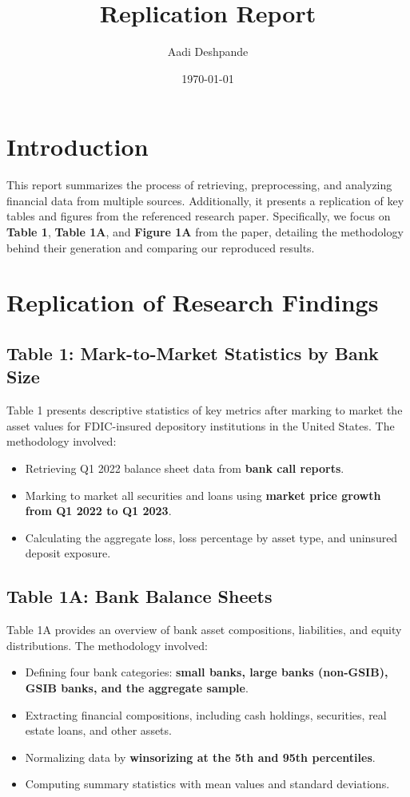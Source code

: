 \documentclass{article}
\title{Replication Report}
\author{Aadi Deshpande}
\date{\today}
\begin{document}
\maketitle

\section{Introduction}
This report summarizes the process of retrieving, preprocessing, and analyzing financial data from multiple sources. Additionally, it presents a replication of key tables and figures from the referenced research paper. Specifically, we focus on \textbf{Table 1}, \textbf{Table 1A}, and \textbf{Figure 1A} from the paper, detailing the methodology behind their generation and comparing our reproduced results.

\section{Replication of Research Findings}

\subsection{Table 1: Mark-to-Market Statistics by Bank Size}
Table 1 presents descriptive statistics of key metrics after marking to market the asset values for FDIC-insured depository institutions in the United States. The methodology involved:

\begin{itemize}
    \item Retrieving Q1 2022 balance sheet data from \textbf{bank call reports}.
    \item Marking to market all securities and loans using \textbf{market price growth from Q1 2022 to Q1 2023}.
    \item Calculating the aggregate loss, loss percentage by asset type, and uninsured deposit exposure.
\end{itemize}

\subsection{Table 1A: Bank Balance Sheets}
Table 1A provides an overview of bank asset compositions, liabilities, and equity distributions. The methodology involved:

\begin{itemize}
    \item Defining four bank categories: \textbf{small banks, large banks (non-GSIB), GSIB banks, and the aggregate sample}.
    \item Extracting financial compositions, including cash holdings, securities, real estate loans, and other assets.
    \item Normalizing data by \textbf{winsorizing at the 5th and 95th percentiles}.
    \item Computing summary statistics with mean values and standard deviations.
\end{itemize}
\end{document}
